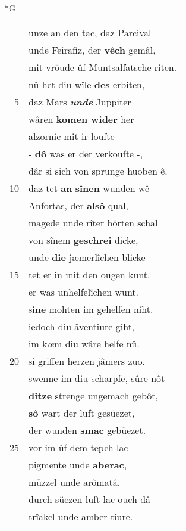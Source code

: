\documentclass[8pt,a4paper,notitlepage]{article}
\begin{document}
\newpage
\begin{table}[ht]
\begin{minipage}[t]{0.5\linewidth}
\small
\begin{center}*G
\end{center}
\begin{tabular}{rl}
 & unze an den tac, daz Parcival\\ 
 & unde Feirafiz, der \textbf{vêch} gemâl,\\ 
 & mit vröude ûf Muntsalfatsche riten.\\ 
 & nû het diu wîle \textbf{des} erbiten,\\ 
5 & daz Mars \textit{\textbf{unde}} Juppiter\\ 
 & wâren \textbf{komen wider} her\\ 
 & alzornic mit ir loufte\\ 
 & - \textbf{dô} was er der verkoufte -,\\ 
 & dâr si sich von sprunge huoben ê.\\ 
10 & daz tet \textbf{an} \textbf{sînen} wunden wê\\ 
 & Anfortas, der \textbf{alsô} qual,\\ 
 & magede unde rîter hôrten schal\\ 
 & von sînem \textbf{geschrei} dicke,\\ 
 & unde \textbf{die} jæmerlîchen blicke\\ 
15 & tet er in mit den ougen kunt.\\ 
 & er was unhelfelîchen wunt.\\ 
 & si\textbf{ne} mohten im gehelfen niht.\\ 
 & iedoch diu âventiure giht,\\ 
 & im k\textit{œ}m diu wâre helfe nû.\\ 
20 & si griffen herzen jâmers zuo.\\ 
 & swenne im diu scharpfe, sûre nôt\\ 
 & \textbf{ditze} strenge ungemach gebôt,\\ 
 & \textbf{sô} wart der luft gesüezet,\\ 
 & der wunden \textbf{smac} gebüezet.\\ 
25 & vor im ûf dem tepch lac\\ 
 & pigmente unde \textbf{aberac},\\ 
 & müzzel unde arômatâ.\\ 
 & durch süezen luft lac ouch dâ\\ 
 & trîakel unde amber tiure.\\ 

\end{tabular}
\end{minipage}
\end{table}
\end{document}
